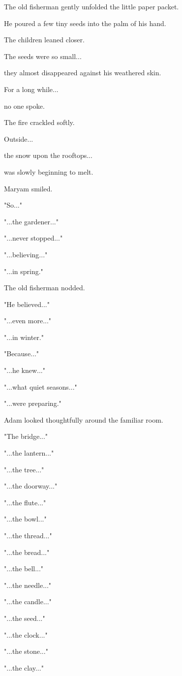 \documentclass[12pt,openany]{book}
\begin{document}
The old fisherman gently unfolded the little paper packet.

He poured a few tiny seeds into the palm of his hand.

The children leaned closer.

The seeds were so small...

they almost disappeared against his weathered skin.

For a long while...

no one spoke.

The fire crackled softly.

Outside...

the snow upon the rooftops...

was slowly beginning to melt.

Maryam smiled.

"So..."

"...the gardener..."

"...never stopped..."

"...believing..."

"...in spring."

The old fisherman nodded.

"He believed..."

"...even more..."

"...in winter."

"Because..."

"...he knew..."

"...what quiet seasons..."

"...were preparing."

Adam looked thoughtfully around the familiar room.

"The bridge..."

"...the lantern..."

"...the tree..."

"...the doorway..."

"...the flute..."

"...the bowl..."

"...the thread..."

"...the bread..."

"...the bell..."

"...the needle..."

"...the candle..."

"...the seed..."

"...the clock..."

"...the stone..."

"...the clay..."
\end{document}
